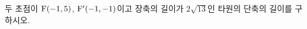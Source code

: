 두 초점이 $\mathrm{F}(-1{,}\mkern3mu\mathopen{}5)$, $\mathrm{F}'(-1{,}\mkern3mu\mathopen{}-1)$이고 장축의 길이가 $2\sqrt{13}$인 타원의 단축의 길이를 구하시오.
